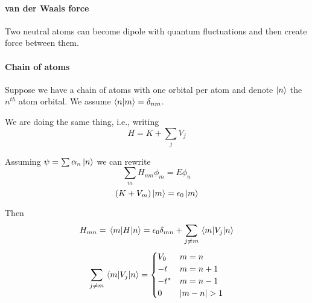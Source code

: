 \paragraph{van der Waals force}
Two neutral atoms can become dipole with quantum fluctuations and then create force between them.

\paragraph{Chain of atoms}
Suppose we have a chain of atoms with one orbital per atom and denote $\ket{n}$ the $n^{th}$ atom orbital. We assume $\braket{n}{m} = \delta_{nm}$.

We are doing the same thing, i.e., writing 
$$H=K+\sum_j V_j$$

Assuming $\psi = \sum \alpha_n \ket{n}$ we can rewrite 
$$\sum_{m} H_{nm} \phi_m = E\phi_n$$
$$(K+V_m)\ket{m} = \epsilon_0 \ket{m}$$

Then
$$H_{mn} = \mel{m}{H}{n} = \epsilon_0 \delta_{mn} + \sum_{j\neq m} \mel{m}{V_j}{n}$$
$$\sum_{j\neq m} \mel{m}{V_j}{n} = \begin{cases}
V_0 & m=n\\
-t & m=n+1\\
-t^* & m=n-1\\
0 & \abs{m-n}>1
\end{cases}$$
